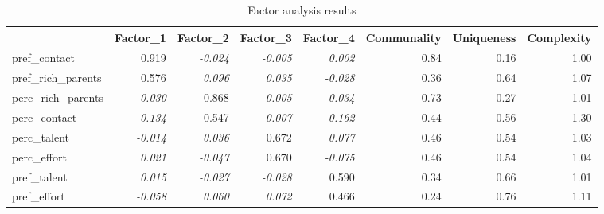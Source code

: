 \documentclass[
  12pt,
]{article}
\newenvironment{Shaded}{\begin{snugshade}}{\end{snugshade}}
\newcommand{\FunctionTok}[1]{\textcolor[rgb]{0.28,0.35,0.67}{#1}}
\newcommand{\NormalTok}[1]{\textcolor[rgb]{0.00,0.23,0.31}{#1}}
\newcommand{\OtherTok}[1]{\textcolor[rgb]{0.00,0.23,0.31}{#1}}
\newcommand{\SpecialCharTok}[1]{\textcolor[rgb]{0.37,0.37,0.37}{#1}}
\begin{document}
\begin{Shaded}
\end{Shaded}

\begin{table}
\caption*{
{\large Factor analysis results}
} 
\fontsize{12.0pt}{14.4pt}\selectfont
\begin{tabular*}{\linewidth}{@{\extracolsep{\fill}}l|rrrrrrr}
\toprule
 & Factor\_1 & Factor\_2 & Factor\_3 & Factor\_4 & Communality & Uniqueness & Complexity \\ 
\midrule\addlinespace[2.5pt]
pref\_contact & 0.919 & {\itshape \textcolor[HTML]{D3D3D3}{-0.024}} & {\itshape \textcolor[HTML]{D3D3D3}{-0.005}} & {\itshape \textcolor[HTML]{D3D3D3}{0.002}} & 0.84 & 0.16 & 1.00 \\ 
pref\_rich\_parents & 0.576 & {\itshape \textcolor[HTML]{D3D3D3}{0.096}} & {\itshape \textcolor[HTML]{D3D3D3}{0.035}} & {\itshape \textcolor[HTML]{D3D3D3}{-0.028}} & 0.36 & 0.64 & 1.07 \\ 
perc\_rich\_parents & {\itshape \textcolor[HTML]{D3D3D3}{-0.030}} & 0.868 & {\itshape \textcolor[HTML]{D3D3D3}{-0.005}} & {\itshape \textcolor[HTML]{D3D3D3}{-0.034}} & 0.73 & 0.27 & 1.01 \\ 
perc\_contact & {\itshape \textcolor[HTML]{D3D3D3}{0.134}} & 0.547 & {\itshape \textcolor[HTML]{D3D3D3}{-0.007}} & {\itshape \textcolor[HTML]{D3D3D3}{0.162}} & 0.44 & 0.56 & 1.30 \\ 
perc\_talent & {\itshape \textcolor[HTML]{D3D3D3}{-0.014}} & {\itshape \textcolor[HTML]{D3D3D3}{0.036}} & 0.672 & {\itshape \textcolor[HTML]{D3D3D3}{0.077}} & 0.46 & 0.54 & 1.03 \\ 
perc\_effort & {\itshape \textcolor[HTML]{D3D3D3}{0.021}} & {\itshape \textcolor[HTML]{D3D3D3}{-0.047}} & 0.670 & {\itshape \textcolor[HTML]{D3D3D3}{-0.075}} & 0.46 & 0.54 & 1.04 \\ 
pref\_talent & {\itshape \textcolor[HTML]{D3D3D3}{0.015}} & {\itshape \textcolor[HTML]{D3D3D3}{-0.027}} & {\itshape \textcolor[HTML]{D3D3D3}{-0.028}} & 0.590 & 0.34 & 0.66 & 1.01 \\ 
pref\_effort & {\itshape \textcolor[HTML]{D3D3D3}{-0.058}} & {\itshape \textcolor[HTML]{D3D3D3}{0.060}} & {\itshape \textcolor[HTML]{D3D3D3}{0.072}} & 0.466 & 0.24 & 0.76 & 1.11 \\ 
\bottomrule
\end{tabular*}
\end{table}
\end{document}
